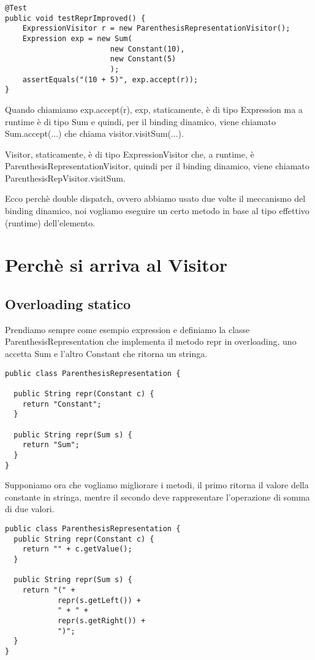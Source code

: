 \begin{lstlisting}
@Test
public void testReprImproved() {
    ExpressionVisitor r = new ParenthesisRepresentationVisitor();
    Expression exp = new Sum(
                        new Constant(10),
                        new Constant(5)
                        );
    assertEquals("(10 + 5)", exp.accept(r));
}
\end{lstlisting}

Quando chiamiamo exp.accept(r), exp, staticamente, è di tipo Expression ma a runtime è di tipo Sum e quindi, per il binding dinamico, viene chiamato 
Sum.accept(...) che chiama visitor.visitSum(...).

Visitor, staticamente, è di tipo ExpressionVisitor che, a runtime, è ParenthesisRepresentationVisitor, quindi per il binding dinamico, viene chiamato 
ParenthesisRepVisitor.visitSum.

Ecco perchè double dispatch, ovvero abbiamo usato due volte il meccanismo del binding dinamico, noi vogliamo eseguire un certo metodo in base al tipo effettivo 
(runtime) dell’elemento.

\section{Perchè si arriva al Visitor}

\subsection{Overloading statico}
Prendiamo sempre come esempio expression e definiamo la classe ParenthesisRepresentation che implementa il metodo repr in overloading, uno accetta Sum e l'altro 
Constant che ritorna un stringa.
\begin{lstlisting}
public class ParenthesisRepresentation {
  
  public String repr(Constant c) {
    return "Constant";
  }
  
  public String repr(Sum s) {
    return "Sum";
  }
}   
\end{lstlisting}

Supponiamo ora che vogliamo migliorare i metodi, il primo ritorna il valore della constante in stringa, mentre il secondo deve rappresentare l'operazione di 
somma di due valori.
\begin{lstlisting}
public class ParenthesisRepresentation {
  public String repr(Constant c) {
    return "" + c.getValue();
  }

  public String repr(Sum s) {
    return "(" +
            repr(s.getLeft()) +
            " + " +
            repr(s.getRight()) +
            ")";
  }
}
\end{lstlisting}


